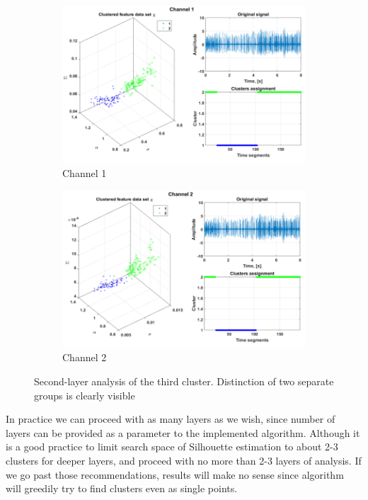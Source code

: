 \documentclass[10pt]{article}
\begin{document}
\begin{figure}[!ht]
  \centering
  \begin{subfigure}[b]{0.49\textwidth}
      \centering
      \includegraphics[width=\textwidth]{wykresy/out3}
      \caption{Channel 1}
      \label{fig:out3}
  \end{subfigure}
  \begin{subfigure}[b]{0.49\textwidth}
      \centering
		\includegraphics[width=\textwidth]{wykresy/out4}
        \caption{Channel 2}
    \label{fig:out4}
  \end{subfigure}
  \caption{Second-layer analysis of the third cluster. Distinction of two separate groups is clearly visible}
  \label{fig:outt}
\end{figure}

In practice we can proceed with as many layers as we wish, since number of layers can be provided as a parameter to the implemented algorithm. Although it is a good practice to limit search space of Silhouette estimation to about 2-3 clusters for deeper layers, and proceed with no more than 2-3 layers of analysis. If we go past those recommendations, results will make no sense since algorithm will greedily try to find clusters even as single points.
\end{document}
